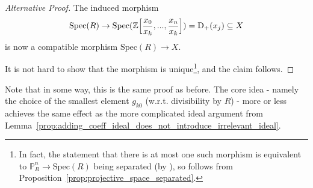 \documentclass{scrartcl}
\newcommand{\Z}{\mathbb{Z}}
\newcommand{\D}[1]{\mathrm{D}_+(#1)}
\renewcommand{\P}{\mathbb{P}}
\newcommand{\Spec}{\mathrm{Spec}}
\newcommand{\citestacks}[1]{\cite[\href{https://stacks.math.columbia.edu/tag/#1}{Tag #1}]{stacks}}
\theoremstyle{definition}
\begin{document}
\begin{proof}[Alternative Proof]
    The induced morphism
    \begin{equation*}
        \Spec(R) \to \Spec(\Z\Bigl[ \frac {x_0} {x_k}, ..., \frac {x_n} {x_k} \Bigr]) = \D{x_j} \subseteq X
    \end{equation*}
    is now a compatible morphism $\Spec(R) \to X$.
    
    It is not hard to show that the morphism is unique\footnote{In fact, the statement that there is at most one such morphism is equivalent to $\P_R^n \to \Spec(R)$ being separated (by \citestacks{01L0}), so follows from Proposition~\ref{prop:projective_space_separated}.}, and the claim follows.
\end{proof}
Note that in some way, this is the same proof as before.
The core idea - namely the choice of the smallest element $g_{k0}$ (w.r.t. divisibility by $R$) - more or less achieves the same effect as the more complicated ideal argument from Lemma~\ref{prop:adding_coeff_ideal_does_not_introduce_irrelevant_ideal}.
\printbibliography
\end{document}
